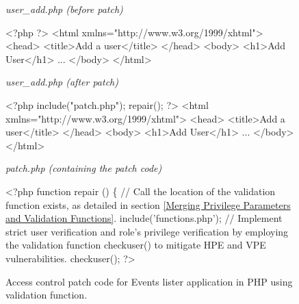 \documentclass[10pt,journal,compsoc]{IEEEtran}
\begin{document}
\begin{CJK}{UTF8}{gbsn}
\begin{figure*}[ht]
\begin{minipage}[t]{0.48\textwidth}
\begin{algorithm}[H]
\small
\renewcommand{\thealgorithm}{}
\small
{}
\caption{\textit{user\_add.php (before patch)}}
\begin{algorithmic}[1]
\State \textless?php
\State ?\textgreater 
\State \textless html xmlns="http://www.w3.org/1999/xhtml"\textgreater 
\State \textless head\textgreater 
\State \textless title\textgreater Add a user\textless/title\textgreater 
\State \textless/head\textgreater 
\State \textless body\textgreater 
\State \textless h1\textgreater Add User\textless/h1\textgreater 
\State ...
\State \textless/body\textgreater 
\State \textless/html\textgreater 
\end{algorithmic}
\end{algorithm}
\end{minipage}
\hfill
\begin{minipage}[t]{0.48\textwidth}
\begin{algorithm}[H]
\renewcommand{\thealgorithm}{}
\small
{}
\caption{\textit{user\_add.php (after patch)}}
\begin{algorithmic}[1]
\State \textless?php
\State \textcolor[rgb]{0.16,0.32,0.66}{include("patch.php");}
\State \textcolor[rgb]{0.16,0.32,0.66}{repair();}
\State ?\textgreater 
\State \textless html xmlns="http://www.w3.org/1999/xhtml"\textgreater 
\State \textless head\textgreater 
\State \textless title\textgreater Add a user\textless/title\textgreater 
\State \textless/head\textgreater 
\State \textless body\textgreater 
\State \textless h1\textgreater Add User\textless/h1\textgreater 
\State ...
\State \textless/body\textgreater 
\State \textless/html\textgreater 
\end{algorithmic}
\end{algorithm}
\end{minipage}
\hfill
\begin{minipage}[t]{1\textwidth}
\begin{algorithm}[H]
\small
\renewcommand{\thealgorithm}{}
\small
{}
\caption{\textit{patch.php (containing the patch code)}}
\begin{algorithmic}[1]
\State \textless?php
\State function repair () \{
\Statex \textcolor[rgb]{0.16,0.32,0.66}{// Call the location of the validation function exists, as detailed in section \ref{Merging Privilege Parameters and Validation Functions}.}
\State include('functions.php');
\Statex \textcolor[rgb]{0.16,0.32,0.66}{// Implement strict user verification and role's privilege verification by employing the validation function checkuser() to mitigate HPE and VPE vulnerabilities.}
\State checkuser(); 
\State?\textgreater 
\end{algorithmic}
\end{algorithm}
\end{minipage}%
\caption{Access control patch code for Events lister application in PHP using validation function.}
\label{Events lister}
\end{figure*}


\end{CJK}
\end{document}
